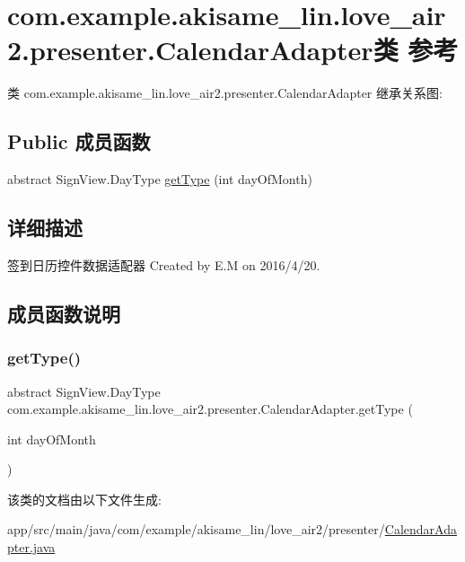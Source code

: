 \hypertarget{classcom_1_1example_1_1akisame__lin_1_1love__air2_1_1presenter_1_1_calendar_adapter}{}\section{com.\+example.\+akisame\+\_\+lin.\+love\+\_\+air2.\+presenter.\+Calendar\+Adapter类 参考}
\label{classcom_1_1example_1_1akisame__lin_1_1love__air2_1_1presenter_1_1_calendar_adapter}


类 com.\+example.\+akisame\+\_\+lin.\+love\+\_\+air2.\+presenter.\+Calendar\+Adapter 继承关系图\+:
\subsection*{Public 成员函数}
\begin{DoxyCompactItemize}
\item 
abstract Sign\+View.\+Day\+Type \mbox{\hyperlink{classcom_1_1example_1_1akisame__lin_1_1love__air2_1_1presenter_1_1_calendar_adapter_a6d3001e57adb225ba492992810ec9c5c}{get\+Type}} (int day\+Of\+Month)
\end{DoxyCompactItemize}


\subsection{详细描述}
签到日历控件数据适配器 Created by E.\+M on 2016/4/20. 

\subsection{成员函数说明}
\mbox{\label{classcom_1_1example_1_1akisame__lin_1_1love__air2_1_1presenter_1_1_calendar_adapter_a6d3001e57adb225ba492992810ec9c5c}} 
\subsubsection{\texorpdfstring{getType()}{getType()}}
{\footnotesize\ttfamily abstract Sign\+View.\+Day\+Type com.\+example.\+akisame\+\_\+lin.\+love\+\_\+air2.\+presenter.\+Calendar\+Adapter.\+get\+Type (\begin{DoxyParamCaption}\item[{int}]{day\+Of\+Month }\end{DoxyParamCaption})\hspace{0.3cm}{\ttfamily [abstract]}}



该类的文档由以下文件生成\+:\begin{DoxyCompactItemize}
\item 
app/src/main/java/com/example/akisame\+\_\+lin/love\+\_\+air2/presenter/\mbox{\hyperlink{_calendar_adapter_8java}{Calendar\+Adapter.\+java}}\end{DoxyCompactItemize}
